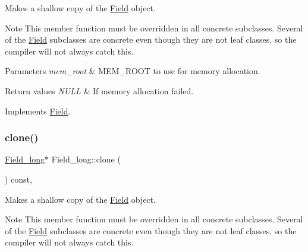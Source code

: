 Makes a shallow copy of the \mbox{\hyperlink{classField}{Field}} object.

\begin{DoxyNote}{Note}
This member function must be overridden in all concrete subclasses. Several of the \mbox{\hyperlink{classField}{Field}} subclasses are concrete even though they are not leaf classes, so the compiler will not always catch this.
\end{DoxyNote}

\begin{DoxyParams}{Parameters}
{\em mem\+\_\+root} & M\+E\+M\+\_\+\+R\+O\+OT to use for memory allocation. \\
\hline
\end{DoxyParams}

\begin{DoxyRetVals}{Return values}
{\em N\+U\+LL} & If memory allocation failed. \\
\hline
\end{DoxyRetVals}


Implements \mbox{\hyperlink{classField_a64979bcb9345803b031fff76a0c3d9fe}{Field}}.

\mbox{\label{classField__long_abe103218b320425eb87e4778641f4358}} 
\subsubsection{\texorpdfstring{clone()}{clone()}\hspace{0.1cm}{\footnotesize\ttfamily [2/2]}}
{\footnotesize\ttfamily \mbox{\hyperlink{classField__long}{Field\+\_\+long}}$\ast$ Field\+\_\+long\+::clone (\begin{DoxyParamCaption}{ }\end{DoxyParamCaption}) const\hspace{0.3cm}{\ttfamily [inline]}, {\ttfamily [virtual]}}

Makes a shallow copy of the \mbox{\hyperlink{classField}{Field}} object.

\begin{DoxyNote}{Note}
This member function must be overridden in all concrete subclasses. Several of the \mbox{\hyperlink{classField}{Field}} subclasses are concrete even though they are not leaf classes, so the compiler will not always catch this.
\end{DoxyNote}

